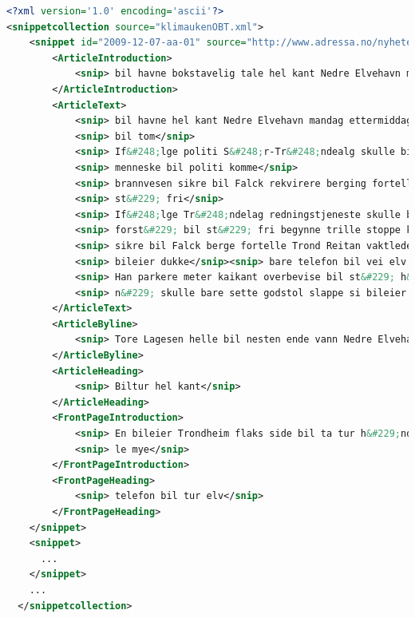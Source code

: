 \begin{lstlisting}[float=ht, language=xml, breaklines=true, label=lst:snippetfile, caption={Snippet file encoded in XML}]
<?xml version='1.0' encoding='ascii'?>
<snippetcollection source="klimaukenOBT.xml">
    <snippet id="2009-12-07-aa-01" source="http://www.adressa.no/nyheter/trondheim/article1419658.ece" tags="Innenriks-ulykker-trafikk-utforkj&#248;ring-trondheim">
        <ArticleIntroduction>
            <snip> bil havne bokstavelig tale hel kant Nedre Elvehavn mandag ettermiddag</snip>
        </ArticleIntroduction>
        <ArticleText>
            <snip> bil havne hel kant Nedre Elvehavn mandag ettermiddag</snip>
            <snip> bil tom</snip>
            <snip> If&#248;lge politi S&#248;r-Tr&#248;ndealg skulle bil tom komme sted</snip>
            <snip> menneske bil politi komme</snip>
            <snip> brannvesen sikre bil Falck rekvirere berging fortelle Curt Ivar R&#248;hmen operasjonsleder S&#248;r-Tr&#248;ndelag politidistrikt</snip>
            <snip> st&#229; fri</snip>
            <snip> If&#248;lge Tr&#248;ndelag redningstjeneste skulle bil begynne rulle h&#229;nd</snip>
            <snip> forst&#229; bil st&#229; fri begynne trille stoppe kant</snip>
            <snip> sikre bil Falck berge fortelle Trond Reitan vaktleder 110-sentral</snip>
            <snip> bileier dukke</snip><snip> bare telefon bil vei elv si Tore Lagesen</snip>
            <snip> Han parkere meter kaikant overbevise bil st&#229; h&#229;ndbrekk</snip>
            <snip> n&#229; skulle bare sette godstol slappe si bileier hvilepuls</snip>
        </ArticleText>
        <ArticleByline>
            <snip> Tore Lagesen helle bil nesten ende vann Nedre Elvehavn</snip>
        </ArticleByline>
        <ArticleHeading>
            <snip> Biltur hel kant</snip>
        </ArticleHeading>
        <FrontPageIntroduction>
            <snip> En bileier Trondheim flaks side bil ta tur h&#229;nd mandag ettermiddag</snip>
            <snip> le mye</snip>
        </FrontPageIntroduction>
        <FrontPageHeading>
            <snip> telefon bil tur elv</snip>
        </FrontPageHeading>
    </snippet>
    <snippet>
      ...
    </snippet>
    ...
  </snippetcollection>
\end{lstlisting}

